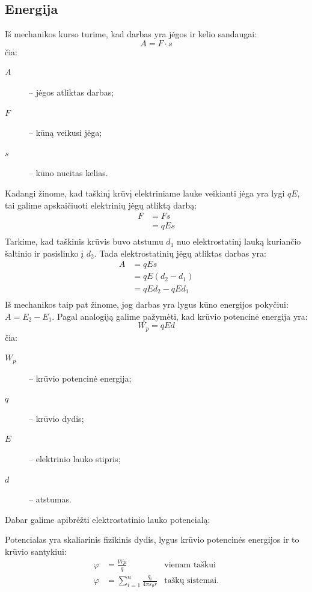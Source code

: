 \subsection{Energija}

Iš mechanikos kurso turime, kad darbas yra jėgos ir kelio sandaugai:
\begin{equation}
  A = F \cdot s
  \label{eq:mechanika:darbas}
\end{equation}
čia:
\begin{description}
  \item[$A$] – jėgos atliktas darbas;
  \item[$F$] – kūną veikusi jėga;
  \item[$s$] – kūno nueitas kelias.
\end{description}

Kadangi žinome, kad taškinį krūvį elektriniame lauke veikianti jėga
yra lygi $qE$, tai galime apskaičiuoti elektrinių jėgų atliktą darbą:
\begin{align*}
  F
  &= Fs \\
  &= qEs \\
\end{align*}
Tarkime, kad taškinis krūvis buvo atstumu $d_{1}$ nuo elektrostatinį
lauką kuriančio šaltinio ir pasislinko į $d_{2}$. Tada elektrostatinių
jėgų atliktas darbas yra:
\begin{align*}
  A
  &= qEs \\
  &= qE\left( d_{2} - d_{1} \right) \\
  &= qEd_{2} - qEd_{1} \\
\end{align*}
Iš mechanikos taip pat žinome, jog darbas yra lygus kūno energijos 
pokyčiui: $A = E_{2} - E_{1}$. Pagal analogiją galime pažymėti, kad
krūvio potencinė energija yra:
\begin{equation*}
  W_{p} = qEd
\end{equation*}
čia:
\begin{description}
  \item[$W_{p}$] – krūvio potencinė energija;
  \item[$q$] – krūvio dydis;
  \item[$E$] – elektrinio lauko stipris;
  \item[$d$] – atstumas.
\end{description}

Dabar galime apibrėžti elektrostatinio lauko potencialą:
\begin{defn}
  Potencialas yra skaliarinis fizikinis dydis, lygus krūvio potencinės
  energijos ir to krūvio santykiui:
  \begin{align*}
    \varphi &= \frac{Wp}{q} & \text{vienam taškui} \\
    \varphi &= \sum ^{n} _{i=1} \frac{q_{i}}{4 \pi \varepsilon_{0} r} 
      & \text{taškų sistemai}.
  \end{align*}
\end{defn}

